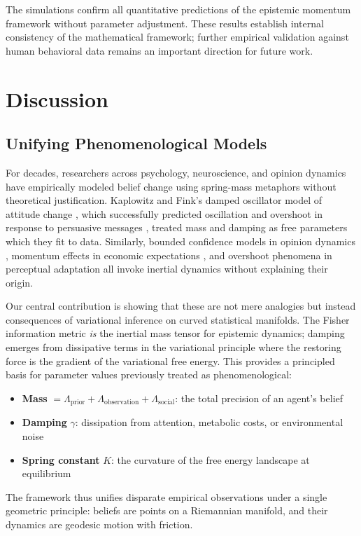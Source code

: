 \documentclass[12pt]{article}
\begin{document}
The simulations confirm all quantitative predictions of the epistemic momentum framework without parameter adjustment. These results establish internal consistency of the mathematical framework; further empirical validation against human behavioral data remains an important direction for future work.


\section{Discussion}

\subsection{Unifying Phenomenological Models}

For decades, researchers across psychology, neuroscience, and opinion dynamics have empirically modeled belief change using spring-mass metaphors without theoretical justification. Kaplowitz and Fink's damped oscillator model of attitude change \citet{kaplowitz1983, kaplowitz1992}, which successfully predicted oscillation and overshoot in response to persuasive messages \citet{fink2002}, treated mass and damping as free parameters which they fit to data. Similarly, bounded confidence models in opinion dynamics \citet{hegselmann2002, deffuant2000}, momentum effects in economic expectations \citet{coibion2015}, and overshoot phenomena in perceptual adaptation \citet{webster2015} all invoke inertial dynamics without explaining their origin.

Our central contribution is showing that these are not mere analogies but instead consequences of variational inference on curved statistical manifolds. The Fisher information metric \textit{is} the inertial mass tensor for epistemic dynamics; damping emerges from dissipative terms in the variational principle where the restoring force is the gradient of the variational free energy. This provides a principled basis for parameter values previously treated as phenomenological:

\begin{itemize}
    \item \textbf{Mass} $= \Lambda_{\text{prior}} + \Lambda_{\text{observation}} + \Lambda_{\text{social}}$: the total precision of an agent's belief
    \item \textbf{Damping} $\gamma$: dissipation from attention, metabolic costs, or environmental noise
    \item \textbf{Spring constant} $K$: the curvature of the free energy landscape at equilibrium
\end{itemize}
The framework thus unifies disparate empirical observations under a single geometric principle: beliefs are points on a Riemannian manifold, and their dynamics are geodesic motion with friction.
\end{document}
